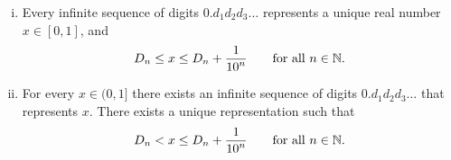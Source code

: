 \begin{prop} \label{prop:decimalprop}
\leavevmode
\begin{enumerate}[(i)]
\item
Every infinite sequence of digits
$0.d_1d_2d_3\ldots$ represents a unique real number $x \in [0,1]$, and
\begin{equation*}
D_n \leq x \leq D_n+\frac{1}{{10}^n} \qquad \text{for all } n \in {\mathbb{N}}.
\end{equation*}
\item
For every $x \in (0,1]$ there exists an infinite sequence of digits
$0.d_1d_2d_3\ldots$ that represents $x$.
There exists a unique representation such that
\begin{equation*}
D_n < x \leq D_n+\frac{1}{{10}^n} \qquad \text{for all } n \in {\mathbb{N}}.
\end{equation*}
\end{enumerate}
\end{prop}

